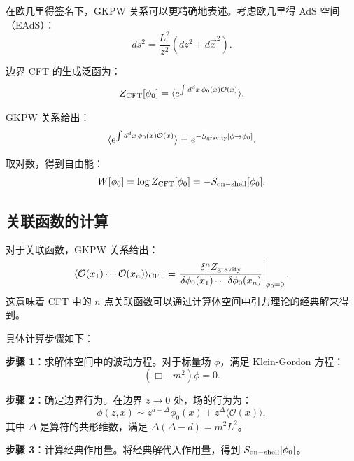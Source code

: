 在欧几里得签名下，GKPW 关系可以更精确地表述。考虑欧几里得 AdS 空间（EAdS）：
\begin{equation}
    ds^2 = \frac{L^2}{z^2} \left(dz^2 + d\vec{x}^2\right).
\end{equation}

边界 CFT 的生成泛函为：
\begin{equation}
    Z_{\rm CFT}[\phi_0] = \langle e^{\int d^d x \, \phi_0(x) \mathcal{O}(x)} \rangle.
\end{equation}

GKPW 关系给出：
\begin{equation}
    \langle e^{\int d^d x \, \phi_0(x) \mathcal{O}(x)} \rangle = e^{-S_{\rm gravity}[\phi \to \phi_0]}.
\end{equation}

取对数，得到自由能：
\begin{equation}
    W[\phi_0] = \log Z_{\rm CFT}[\phi_0] = -S_{\rm on-shell}[\phi_0].
\end{equation}

\subsection{关联函数的计算}

\begin{theorem}
对于关联函数，GKPW 关系给出：
\begin{equation}
    \langle \mathcal{O}(x_1) \cdots \mathcal{O}(x_n) \rangle_{\rm CFT}
    = \left. \frac{\delta^n Z_{\rm gravity}}{\delta \phi_0(x_1) \cdots \delta \phi_0(x_n)} \right|_{\phi_0=0}.
\end{equation}
这意味着 CFT 中的 $n$ 点关联函数可以通过计算体空间中引力理论的经典解来得到。
\end{theorem}

具体计算步骤如下：

\textbf{步骤 1}：求解体空间中的波动方程。对于标量场 $\phi$，满足 Klein-Gordon 方程：
\begin{equation}
    (\Box - m^2) \phi = 0.
\end{equation}

\textbf{步骤 2}：确定边界行为。在边界 $z \to 0$ 处，场的行为为：
\begin{equation}
    \phi(z, x) \sim z^{d-\Delta} \phi_0(x) + z^\Delta \langle \mathcal{O}(x) \rangle,
\end{equation}
其中 $\Delta$ 是算符的共形维数，满足 $\Delta(\Delta-d) = m^2 L^2$。

\textbf{步骤 3}：计算经典作用量。将经典解代入作用量，得到 $S_{\rm on-shell}[\phi_0]$。

